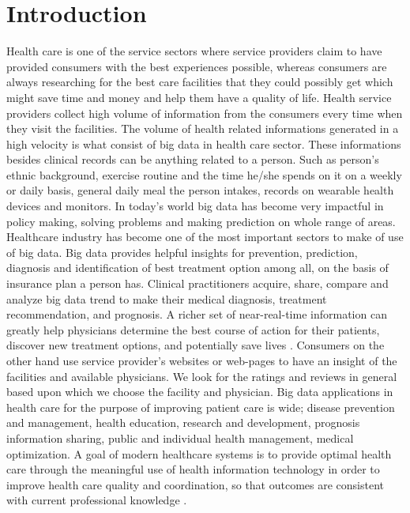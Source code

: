 \documentclass[sigconf]{acmart}
\begin{document}
\section{Introduction}
Health care is one of the service sectors where service providers claim to have provided consumers with the best experiences possible, whereas consumers are always researching for the best care facilities that they could possibly get which might save time and money and help them have a quality of life. Health service providers collect high volume of information from the consumers every time when they visit the facilities. The volume of health related informations generated in a high velocity is what consist of big data in health care sector.
These informations besides clinical records can be anything related to a person. Such as  person's ethnic background, exercise routine
and the time he/she spends on it on a weekly or daily basis, general daily meal the person intakes, records on wearable health devices 
and monitors. In today's world big data has become very impactful in policy making, solving problems and making prediction on whole range 
of areas. Healthcare industry has become one of the most important sectors to make of use of big data. Big data provides helpful insights 
for prevention, prediction, diagnosis and identification of best treatment option among all, on the basis of insurance plan a person 
has. Clinical practitioners acquire, share, compare and analyze big data trend to make their medical diagnosis, treatment
recommendation, and prognosis. A richer set of near-real-time information can greatly help
physicians determine the best course of action for their patients, discover new treatment
options, and potentially save lives \cite{www-hpe}. Consumers on the other hand use service provider's websites or web-pages to have an insight of the facilities and available physicians.
We look for the ratings and reviews in general based upon which we choose the facility and physician. Big data applications in health care for the purpose of
improving patient care is wide; disease prevention and management, health education, research and development, prognosis  
information sharing, public and individual health management, medical optimization. A goal of modern healthcare systems is to provide optimal health care through the meaningful use of health information technology in order to improve health care quality and coordination, so that outcomes are consistent with current professional knowledge \cite{www-mapr-com}.
\end{document}
